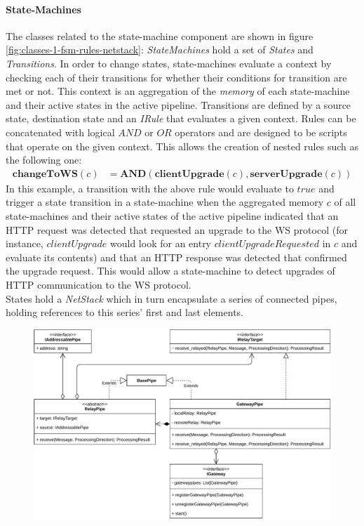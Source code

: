 \paragraph{State-Machines} The classes related to the state-machine component are shown in figure \ref{fig:classes-1-fsm-rules-netstack}: \emph{StateMachines} hold a set of \emph{States} and \emph{Transitions}. In order to change states, state-machines evaluate a context by checking each of their transitions for whether their conditions for transition are met or not. This context is an aggregation of the \emph{memory} of each state-machine and their active states in the active pipeline. Transitions are defined by a source state, destination state and an \emph{IRule} that evaluates a given context. Rules can be concatenated with logical $AND$ or $OR$ operators and are designed to be scripts that operate on the given context. This allows the creation of nested rules such as the following one:
\begin{align*}
    \mathbf{changeToWS}(c) & = \mathbf{AND}(\mathbf{clientUpgrade}(c), \mathbf{serverUpgrade}(c))
\end{align*}
In this example, a transition with the above rule would evaluate to $true$ and trigger a state transition in a state-machine when the aggregated memory $c$ of all state-machines and their active states of the active pipeline indicated that an \ac{HTTP} request was detected that requested an upgrade to the \ac{WS} protocol (for instance, $clientUpgrade$ would look for an entry $clientUpgradeRequested$ in $c$ and evaluate its contents) and that an \ac{HTTP} response was detected that confirmed the upgrade request. This would allow a state-machine to detect upgrades of \ac{HTTP} communication to the \ac{WS} protocol.\\
States hold a \emph{NetStack} which in turn encapsulate a series of connected pipes, holding references to this series' first and last elements.
\begin{figure}[h]
    \centering
    \includegraphics[width=14cm]{img/ch05/classes-3-gateway.pdf}
    \label{fig:classes-3-gateway}
\end{figure}
